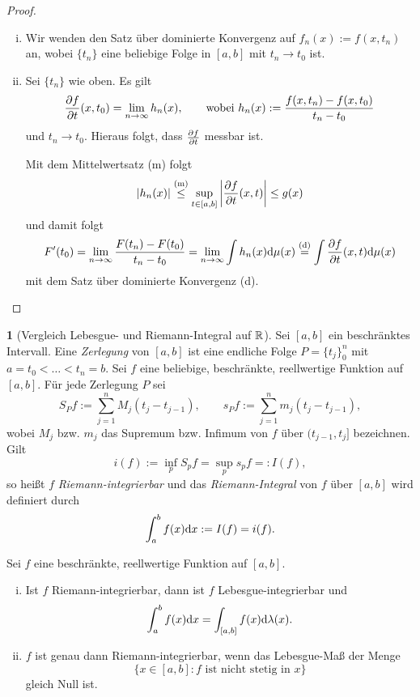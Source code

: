 \documentclass[
 a4paper,
 12pt,
 parskip=half
 ]{scrreprt}
\theoremstyle{plain}
\theoremstyle{definition}
\newtheorem{prgp}[thm]{} %
\numberwithin{equation}{section}
\begin{document}
\begin{proof}
 \begin{enumerate}[(i)]
  \item Wir wenden den Satz über dominierte Konvergenz auf $f_n(x) := f(x, t_n)$ an, wobei $\{ t_n \}$ eine beliebige Folge in $[a,b]$ mit $t_n \to t_0$ ist. 
  \item Sei $\{ t_n \}$ wie oben. Es gilt
  \[ \frac{\partial f}{\partial t}(x,t_0) = \lim_{n \to \infty} h_n(x), \qquad \text{wobei } h_n(x) := \frac{f(x,t_n) - f(x,t_0)}{t_n -t_0} \]
  und $t_n \to t_0$. Hieraus folgt, dass $\frac{\partial f}{\partial t}$ messbar ist.
  
  Mit dem Mittelwertsatz (m) folgt
  \[ |h_n(x)| \overset{(\text{m})}{\le} \sup_{t \in [a,b]} \left| \frac{\partial f}{\partial t} (x,t) \right| \le g(x) \]
  und damit folgt
  \[ F'(t_0) = \lim_{n \to \infty} \frac{F(t_n) - F(t_0)}{t_n - t_0} = \lim_{n \to \infty} \int h_n(x) \mathrm{d} \mu(x) \overset{(\text{d})}{=} \int \frac{\partial f}{\partial t} (x,t) \mathrm{d} \mu(x) \]
  mit dem Satz über dominierte Konvergenz (d). \qedhere
 \end{enumerate}
\end{proof}

\begin{prgp}[Vergleich Lebesgue- und Riemann-Integral auf $\mathbb{R}$]
 Sei $[a,b]$ ein beschränktes Intervall. Eine \emph{Zerlegung} von $[a,b]$ ist eine endliche Folge $P = \{ t_j \}_0^n$ mit $a = t_0 < \ldots < t_n = b$. Sei $f$ eine beliebige, beschränkte, reellwertige Funktion auf $[a,b]$. Für jede Zerlegung $P$ sei
\[ S_P f := \sum_{j=1}^n M_j(t_j-t_{j-1}), \qquad s_P f := \sum_{j=1}^n m_j(t_j-t_{j-1}), \]
wobei $M_j$ bzw. $m_j$ das Supremum bzw. Infimum von $f$ über $(t_{j-1},t_j]$ bezeichnen. Gilt
\[ i(f) := \inf_{p} S_p f = \sup_p s_p f =: I(f), \]
so heißt $f$ \emph{Riemann-integrierbar} und das \emph{Riemann-Integral} von $f$ über $[a,b]$ wird definiert durch
\[ \int_a^b f(x) \mathrm{d} x := I(f) = i(f). \]
\end{prgp}

\begin{thm}
 Sei $f$ eine beschränkte, reellwertige Funktion auf $[a,b]$.
 \begin{enumerate}[(i)]
  \item Ist $f$ Riemann-integrierbar, dann ist $f$ Lebesgue-integrierbar und
  \[ \int_a^b f(x) \mathrm{d} x = \int_{[a,b]} f(x) \mathrm{d} \lambda(x). \]
  \item $f$ ist genau dann Riemann-integrierbar, wenn das Lebesgue-Maß der Menge
  \[ \{ x \in [a,b] : f \text{ ist nicht stetig in } x \} \]
  gleich Null ist.
 \end{enumerate}
\end{thm}
\end{document}
